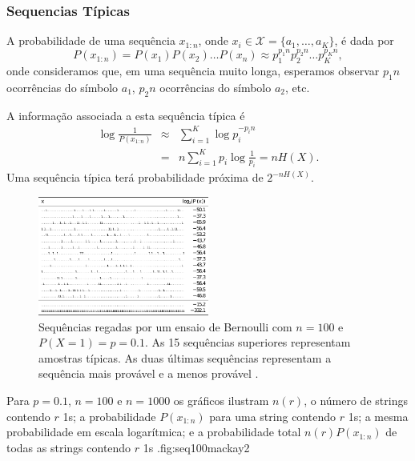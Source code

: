 \begin{frame}[allowframebreaks]
  \frametitle{Sequencias Típicas} 
  A probabilidade de uma sequência $x_{1:n}$, onde $x_i \in \mathcal{X} = \{a_1, \ldots, a_K\}$, é dada por
  \begin{equation}
  P(x_{1:n}) = P(x_1) P(x_2) \ldots P(x_n) \approx p_1^{p_1 n} p_2^{p_2 n} \ldots p_K^{p_K n} ,
  \end{equation}
  onde consideramos que, em uma sequência muito longa, esperamos observar $p_1 n$ ocorrências do símbolo $a_1$,
  $p_2 n$ ocorrências do símbolo $a_2$, etc.

  A informação associada a esta sequência típica é
  \begin{eqnarray}
  \log \frac{1}{P(x_{1:n})} &\approx& \sum_{i=1}^K \log p_i^{-p_i n} \nonumber \\
                &=& n \sum_{i=1}^K p_i \log \frac{1}{p_i} = n H(X).
  \end{eqnarray}
  Uma sequência típica terá probabilidade próxima de $2^{-n H(X)}$.

  \framebreak
  \begin{figure}[h!]
  \centering
  \includegraphics[width=0.5\textwidth]{images/seq100mackay.pdf}
  \caption{Sequências regadas por um ensaio de Bernoulli com $n=100$ e $P(X=1) = p = 0.1$. 
        As 15 sequências superiores representam amostras típicas. As duas últimas sequências
        representam a sequência mais provável e a menos provável \citep{mackay2003}.}
  \label{fig:seq100mackay}
  \end{figure}

  \framebreak

  {Para $p=0.1$, $n=100$ e $n=1000$ os gráficos ilustram $n(r)$, o número de strings contendo
  $r$ 1s; a probabilidade $P(x_{1:n})$ para uma string contendo $r$ 1s; a mesma probabilidade
  em escala logarítmica; e a probabilidade total $n(r) P(x_{1:n})$ de todas as strings contendo $r$ 1s \citep{mackay2003}.}{fig:seq100mackay2}


\end{frame}
